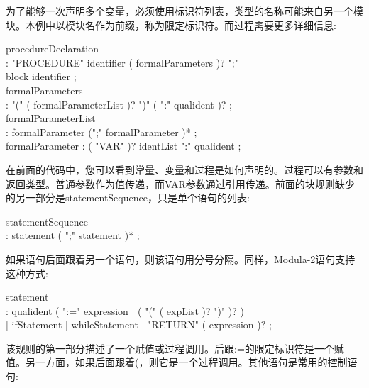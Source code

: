 为了能够一次声明多个变量，必须使用标识符列表，类型的名称可能来自另一个模块。本例中以模块名作为前缀，称为限定标识符。而过程需要更多详细信息:\par

\begin{tcolorbox}[colback=white,colframe=black]
procedureDeclaration \\
\hspace*{0.5cm}: "PROCEDURE" identifier ( formalParameters )? ";" \\
\hspace*{1cm}block identifier ; \\
formalParameters \\
\hspace*{0.5cm}: "(" ( formalParameterList )? ")" ( ":" qualident )? ; \\
formalParameterList \\
\hspace*{0.5cm}: formalParameter (";" formalParameter )* ; \\
formalParameter : ( "VAR" )? identList ":" qualident ;
\end{tcolorbox}

在前面的代码中，您可以看到常量、变量和过程是如何声明的。过程可以有参数和返回类型。普通参数作为值传递，而VAR参数通过引用传递。前面的块规则缺少的另一部分是statementSequence，只是单个语句的列表:\par

\begin{tcolorbox}[colback=white,colframe=black]
statementSequence \\
\hspace*{0.5cm}: statement ( ";" statement )* ;
\end{tcolorbox}

如果语句后面跟着另一个语句，则该语句用分号分隔。同样，Modula-2语句支持这种方式:\par

\begin{tcolorbox}[colback=white,colframe=black]
statement \\
\hspace*{0.5cm}: qualident ( ":=" expression | ( "(" ( expList )? ")" )? ) \\
\hspace*{0.5cm}| ifStatement | whileStatement | "RETURN" ( expression )? ;
\end{tcolorbox}

该规则的第一部分描述了一个赋值或过程调用。后跟:=的限定标识符是一个赋值。另一方面，如果后面跟着(，则它是一个过程调用。其他语句是常用的控制语句:\par

